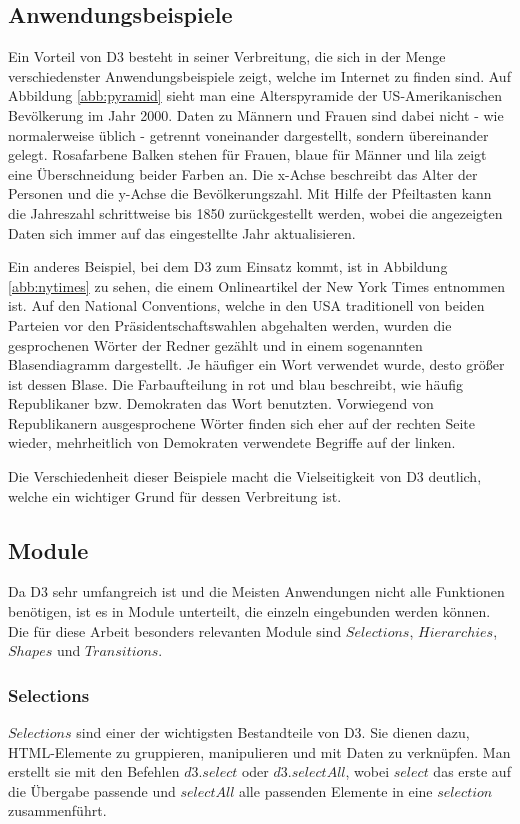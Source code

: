 \subsection{Anwendungsbeispiele}\label{sec:anwendung}
Ein Vorteil von D3 besteht in seiner Verbreitung, die sich in der Menge verschiedenster Anwendungsbeispiele zeigt, welche im Internet zu finden sind. Auf Abbildung \ref{abb:pyramid} sieht man eine Alterspyramide der US-Amerikanischen Bevölkerung im Jahr 2000.  Daten zu Männern und Frauen sind dabei nicht - wie normalerweise üblich - getrennt voneinander dargestellt, sondern übereinander gelegt. Rosafarbene Balken stehen für Frauen, blaue für Männer und lila zeigt eine Überschneidung beider Farben an. Die x-Achse beschreibt das Alter der Personen und die y-Achse die Bevölkerungszahl. Mit Hilfe der Pfeiltasten kann die Jahreszahl schrittweise bis 1850 zurückgestellt werden, wobei die angezeigten Daten sich immer auf das eingestellte Jahr aktualisieren.

Ein anderes Beispiel, bei dem D3 zum Einsatz kommt, ist in Abbildung \ref{abb:nytimes} zu sehen, die einem Onlineartikel der New York Times entnommen ist.  Auf den \glqq National Conventions\grqq, welche in den USA traditionell von beiden Parteien vor den Präsidentschaftswahlen abgehalten werden, wurden die gesprochenen Wörter der Redner gezählt und in einem sogenannten Blasendiagramm dargestellt. Je häufiger ein Wort verwendet wurde, desto größer ist dessen Blase. Die Farbaufteilung in rot und blau beschreibt, wie häufig Republikaner bzw. Demokraten das Wort benutzten. Vorwiegend von Republikanern ausgesprochene Wörter finden sich eher auf der rechten Seite wieder, mehrheitlich von Demokraten verwendete Begriffe auf der linken.

Die Verschiedenheit dieser Beispiele macht die Vielseitigkeit von D3 deutlich, welche ein wichtiger Grund für dessen Verbreitung ist.
\subsection{Module}
Da D3 sehr umfangreich ist und die Meisten Anwendungen nicht alle Funktionen benötigen, ist es in Module unterteilt, die einzeln eingebunden werden können. Die für diese Arbeit besonders relevanten Module sind $Selections$, $Hierarchies$, $Shapes$ und $Transitions$.

\subsubsection*{Selections}\label{sec:selections}
$Selections$ sind einer der wichtigsten Bestandteile von D3. Sie dienen dazu, HTML-Elemente zu gruppieren, manipulieren und mit Daten zu verknüpfen. Man erstellt sie mit den Befehlen $d3.select$ oder $d3.selectAll$, wobei $select$ das erste auf die Übergabe passende und $selectAll$ alle passenden Elemente in eine $selection$ zusammenführt.  

